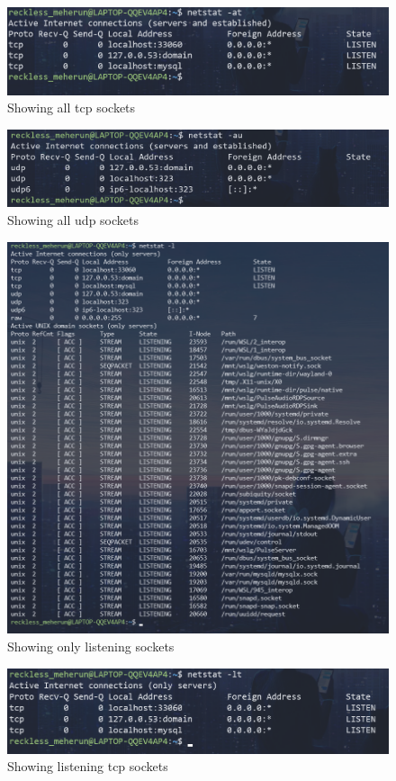 \documentclass[11pt]{article}
\begin{document}
\begin{figure}[H]
	\centering
	\includegraphics[width=\textwidth]{res/netstat 3.png}
	\caption{Showing all tcp sockets}
\end{figure}
\begin{figure}[H]
	\centering
	\includegraphics[width=\textwidth]{res/netstat 4.png}
	\caption{Showing all udp sockets}
\end{figure}
\begin{figure}[H]
	\centering
	\includegraphics[width=\textwidth]{res/netstat 5.png}
	\caption{Showing only listening sockets}
\end{figure}
\begin{figure}[H]
	\centering
	\includegraphics[width=\textwidth]{res/netstat 6.png}
	\caption{Showing listening tcp sockets}
\end{figure}
\end{document}
